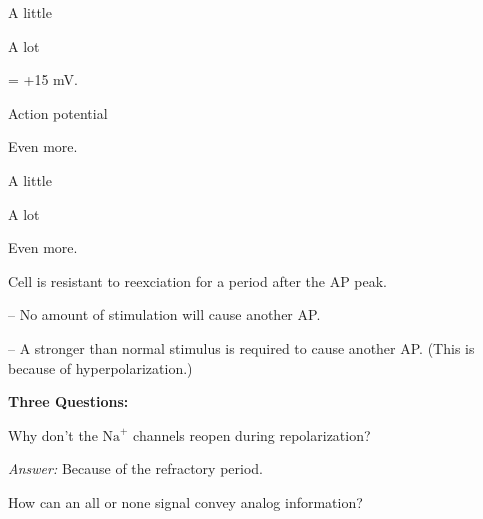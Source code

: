 \begin{coloredlist}
\begin{coloredlist}
\begin{coloredlist}
            \begin{coloredlist}
                \item A little 
                \item A lot
                \begin{coloredlist}
                    \item {} = +15 mV.
                    \item Action potential
                \end{coloredlist}
                \item Even more.
            \end{coloredlist}
            \item {}
            \begin{coloredlist}
                \item A little
                \item A lot
                \item Even more.
            \end{coloredlist}
        \end{coloredlist}
        \item {}
        \begin{coloredlist}
            \item Cell is resistant to reexciation for a period after the AP peak.
            \begin{coloredlist}
                \item {} -- No amount of stimulation will cause another AP.
                \item {} -- A stronger than normal stimulus is required to cause another AP. (This is because of hyperpolarization.)
            \end{coloredlist}
        \end{coloredlist}
        \item \textbf{Three Questions:}
        \begin{coloredlist}
            \item Why don't the \(\text{Na}^{+}\) channels reopen during repolarization?
            \begin{coloredlist}
                \item \textit{Answer:} Because of the refractory period.
            \end{coloredlist}
            \item How can an all or none signal convey analog information?

\end{coloredlist}
\end{coloredlist}
\end{coloredlist}
